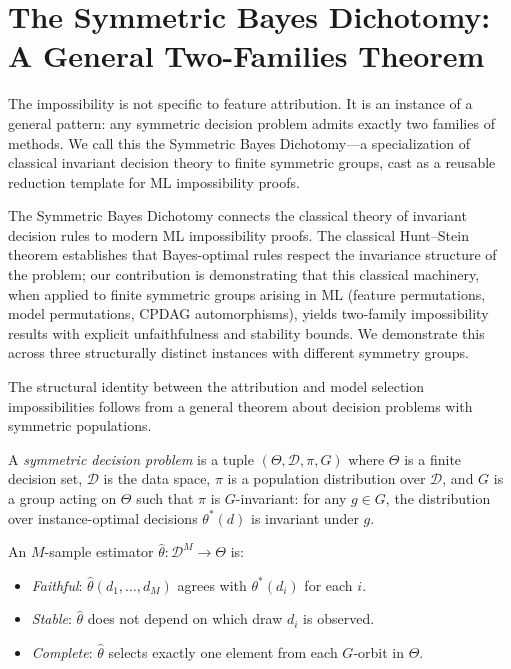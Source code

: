 \documentclass{jmlr}
\begin{document}

\section{The Symmetric Bayes Dichotomy: A General Two-Families Theorem}
\label{sec:sbd}

The impossibility is not specific to feature attribution. It is an instance of a general pattern: any symmetric decision problem admits exactly two families of methods. We call this the Symmetric Bayes Dichotomy---a specialization of classical invariant decision theory \citep{lehmann2005testing} to finite symmetric groups, cast as a reusable reduction template for ML impossibility proofs.

The Symmetric Bayes Dichotomy connects the classical theory of invariant decision rules \citep{lehmann2005testing,hunt1946} to modern ML impossibility proofs. The classical Hunt--Stein theorem establishes that Bayes-optimal rules respect the invariance structure of the problem; our contribution is demonstrating that this classical machinery, when applied to finite symmetric groups arising in ML (feature permutations, model permutations, CPDAG automorphisms), yields two-family impossibility results with explicit unfaithfulness and stability bounds. We demonstrate this across three structurally distinct instances with different symmetry groups.

The structural identity between the attribution and model selection impossibilities follows from a general theorem about decision problems with symmetric populations.

\begin{definition}
\label{def:symmetric-decision}
A \emph{symmetric decision problem} is a tuple $(\Theta, \mathcal{D}, \pi, G)$ where $\Theta$ is a finite decision set, $\mathcal{D}$ is the data space, $\pi$ is a population distribution over $\mathcal{D}$, and $G$ is a group acting on $\Theta$ such that $\pi$ is $G$-invariant: for any $g \in G$, the distribution over instance-optimal decisions $\theta^*(d)$ is invariant under $g$.

An $M$-sample estimator $\hat\theta : \mathcal{D}^M \to \Theta$ is:
\begin{itemize}
    \item \emph{Faithful}: $\hat\theta(d_1, \ldots, d_M)$ agrees with $\theta^*(d_i)$ for each $i$.
    \item \emph{Stable}: $\hat\theta$ does not depend on which draw $d_i$ is observed.
    \item \emph{Complete}: $\hat\theta$ selects exactly one element from each $G$-orbit in $\Theta$.
\end{itemize}
\end{definition}
\end{document}
